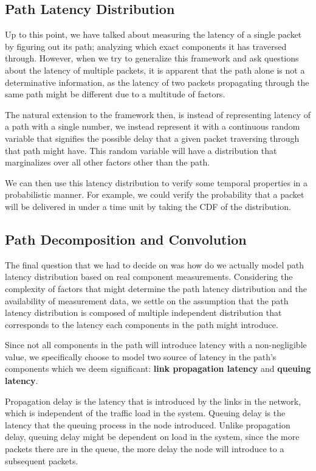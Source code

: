 \documentclass[10pt,sigconf,letterpaper,anonymous,nonacm]{acmart}
\begin{document}
\subsection{Path Latency Distribution}
Up to this point, we have talked about measuring the latency of a single packet by figuring out 
its path; analyzing which exact components it has traversed through.
However, when we try to generalize this framework and ask questions about the latency of multiple 
packets, it is apparent that the path alone is not a determinative information, as the latency 
of two packets propagating through the same path might be different due to a multitude of factors.

The natural extension to the framework then, is instead of representing latency of a path with a 
single number, we instead represent it with a continuous random variable that signifies the 
possible delay that a given packet traversing through that path might have.
This random variable will have a distribution that marginalizes over all other factors other than 
the path.

We can then use this latency distribution to verify some temporal properties in a probabilistic 
manner.
For example, we could verify the probability that a packet will be delivered in under a time 
unit by taking the CDF of the distribution.

\subsection{Path Decomposition and Convolution}
The final question that we had to decide on was how do we actually model path latency distribution
based on real component measurements.
Considering the complexity of factors that might determine the path latency distribution and the 
availability of measurement data, we settle on the assumption that the path latency distribution 
is composed of multiple independent distribution that corresponds to the latency each components 
in the path might introduce.

Since not all components in the path will introduce latency with a non-negligible value, we 
specifically choose to model two source of latency in the path's components which we deem 
significant: \textbf{link propagation latency} and \textbf{queuing latency}.

Propagation delay is the latency that is introduced by the links in the network, which is 
independent of the traffic load in the system.
Queuing delay is the latency that the queuing process in the node introduced. 
Unlike propagation delay, queuing delay might be dependent on load in the system, since the more 
packets there are in the queue, the more delay the node will introduce to a subsequent packets.
\end{document}
